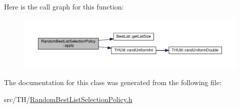Here is the call graph for this function\+:
\nopagebreak
\begin{figure}[H]
\begin{center}
\leavevmode
\includegraphics[width=350pt]{classRandomBestListSelectionPolicy_ae32f042697269d74c6fed4b9ff6771c8_cgraph}
\end{center}
\end{figure}




The documentation for this class was generated from the following file\+:\begin{DoxyCompactItemize}
\item 
src/\+T\+H/\hyperlink{RandomBestListSelectionPolicy_8h}{Random\+Best\+List\+Selection\+Policy.\+h}\end{DoxyCompactItemize}
